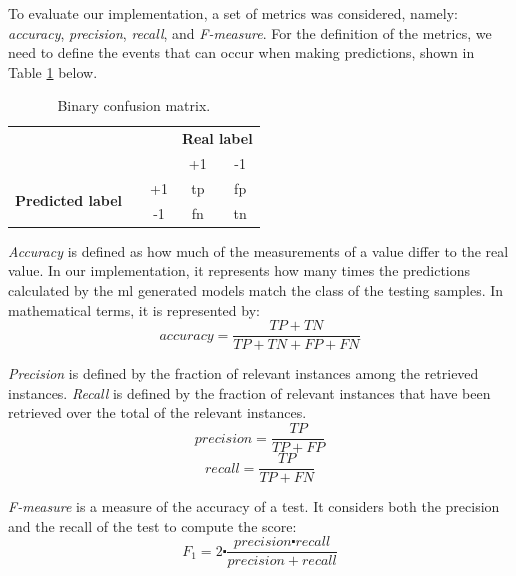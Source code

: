 To evaluate our implementation, a set of metrics was considered, namely: \emph{accuracy}, \emph{precision}, \emph{recall}, and \emph{F-measure}. For the definition of the metrics, we need to define the events that can occur when making predictions, shown in Table \ref{table:notation} below. 
\begin{table}[htp]
\centering
\caption{Binary confusion matrix.}
\label{table:notation}
\begin{tabular}{cc|c|c|} 
\cline{3-3}\cline{4-4}
                                                         &    & \multicolumn{2}{c|}{\textbf{Real label}}                             \\ 
\cline{3-3}\cline{4-4}
                                                         &    & +1                              & -1                        \\ 
\hline
\multicolumn{1}{|c|}{\multirow{2}{*}{\textbf{Predicted label}~~}} & +1 & \ac{tp}        & \ac{fp}  \\ 
\cline{2-4}
\multicolumn{1}{|l|}{}                                   & -1 & \ac{fn}        & \ac{tn}  \\
\hline
\end{tabular}
\end{table}




\textit{Accuracy} is defined as how much of the measurements of a value differ to the real value. In our implementation, it represents how many times the predictions calculated by the \ac{ml} generated models match the class of the testing samples. In mathematical terms, it is represented by:
\begin{equation}
\label{eq:accuracy}
accuracy=\frac{TP + TN} {TP + TN + FP + FN} 
\end{equation}


\textit{Precision} is defined by the fraction of relevant instances among the retrieved instances. \textit{Recall} is defined by the fraction of relevant instances that have been retrieved over the total of the relevant instances.
\begin{equation}
\label{eq:precision}
precision=\frac{TP}{TP + FP}
\end{equation}
\begin{equation}
\label{eq:recall}
recall=\frac{TP}{TP + FN}
\end{equation}

\textit{F-measure} is a measure of the accuracy of a test. It considers both the precision and the recall of the test to compute the score:
\begin{equation}
\label{eq:f-measure}
F_1=2\centerdot \frac{precision\centerdot recall}{precision + recall}
\end{equation}



